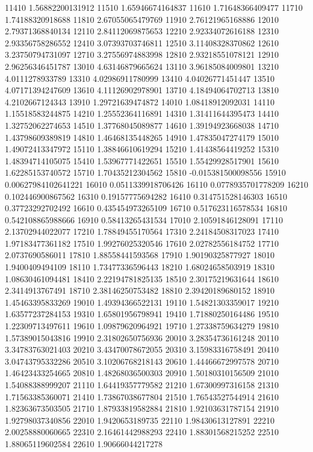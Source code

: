 {11410 1.56882200131912
11510 1.65946674164837
11610 1.71648366409477
11710 1.74188320918688
11810 2.67055065479769
11910 2.76121965168886
12010 2.79371368840134
12110 2.84112069875653
12210 2.92334072616188
12310 2.93356758286552
12410 3.07393703746811
12510 3.11408328370862
12610 3.23750794731097
12710 3.27556974883998
12810 2.93218551078121
12910 2.96256346451787
13010 4.63146879665624
13110 3.96185084009801
13210 4.0111278933789
13310 4.02986911780999
13410 4.04026771451447
13510 4.07171394247609
13610 4.11126902978901
13710 4.18494064702713
13810 4.2102667124343
13910 1.29721639474872
14010 1.08418912092031
14110 1.15518583244875
14210 1.25552364116891
14310 1.31411644395473
14410 1.32752062274653
14510 1.37768045089877
14610 1.39194923668038
14710 1.43798609389819
14810 1.46468135448265
14910 1.47835047274179
15010 1.49072413347972
15110 1.38846610619294
15210 1.41438564419252
15310 1.48394714105075
15410 1.53967771422651
15510 1.55429928517901
15610 1.62285153740572
15710 1.70435212304562
15810 -0.015381500098556
15910 0.00627984102641221
16010 0.0511339918706426
16110 0.0778935701778209
16210 0.102446900867562
16310 0.19157775694282
16410 0.314751528146303
16510 0.37723292702492
16610 0.435454973265109
16710 0.517623116578534
16810 0.542108865988666
16910 0.58413265431534
17010 2.10591846128091
17110 2.13702944022077
17210 1.78849455170564
17310 2.24184508317023
17410 1.97183477361182
17510 1.99276025320546
17610 2.02782556184752
17710 2.0737690586011
17810 1.88558441593568
17910 1.90190325877927
18010 1.9400409494109
18110 1.73477336596443
18210 1.68024658503919
18310 1.08630461094481
18410 2.22194781825135
18510 2.30175219631644
18610 2.3414913767491
18710 2.38146250753482
18810 2.39420189680152
18910 1.45463395833269
19010 1.49394366522131
19110 1.54821303359017
19210 1.63577237284153
19310 1.65801956798941
19410 1.71880250164486
19510 1.22309713497611
19610 1.09879620964921
19710 1.27338759634279
19810 1.57389015043816
19910 2.31802650756936
20010 3.28354736161248
20110 3.34783763021403
20210 3.43470078672055
20310 3.15983316758491
20410 3.04743795332286
20510 3.10206768218143
20610 1.44466672997578
20710 1.46423433254665
20810 1.48268036500303
20910 1.50180310156509
21010 1.54088388999207
21110 1.64419357779582
21210 1.67300997316158
21310 1.71563385360071
21410 1.73867038677804
21510 1.76543527544914
21610 1.82363673503505
21710 1.87933819582884
21810 1.92103631787154
21910 1.92798037340856
22010 1.9420653189735
22110 1.98430613127891
22210 2.00258880060665
22310 2.16461442988293
22410 1.88301568215252
22510 1.88065119602584
22610 1.90666044217278
}
